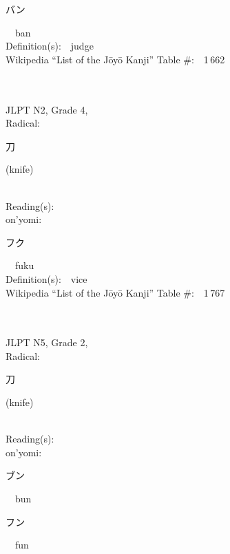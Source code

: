 \begin{multicols}{2}
{\hspace*{2em}}{\begin{CJK}{UTF8}{min} バン \end{CJK}}\ \ ban\ \ \\
Definition(s):\ \ judge \\
Wikipedia ``List of the J\=oy\=o Kanji'' Table \#:\ \ 1\,662 \\
\ \ \\
{\fontsize{34pt}{40pt}  }\ \ \\  %
{JLPT N2, Grade 4, \\Radical:\ \ {\begin{CJK}{UTF8}{min} 刀 \end{CJK}} (knife) } \\
Reading(s):\ \ \\
{\hspace*{1em}}on'yomi:\ \ \\
{\hspace*{2em}}{\begin{CJK}{UTF8}{min} フク \end{CJK}}\ \ fuku\ \ \\
Definition(s):\ \ vice \\
Wikipedia ``List of the J\=oy\=o Kanji'' Table \#:\ \ 1\,767 \\
\ \ \\
{\fontsize{34pt}{40pt}  }\ \ \\  %
{JLPT N5, Grade 2, \\Radical:\ \ {\begin{CJK}{UTF8}{min} 刀 \end{CJK}} (knife) } \\
Reading(s):\ \ \\
{\hspace*{1em}}on'yomi:\ \ \\
{\hspace*{2em}}{\begin{CJK}{UTF8}{min} ブン \end{CJK}}\ \ bun\ \ \\
{\hspace*{2em}}{\begin{CJK}{UTF8}{min} フン \end{CJK}}\ \ fun\ \ \\

\end{multicols}
